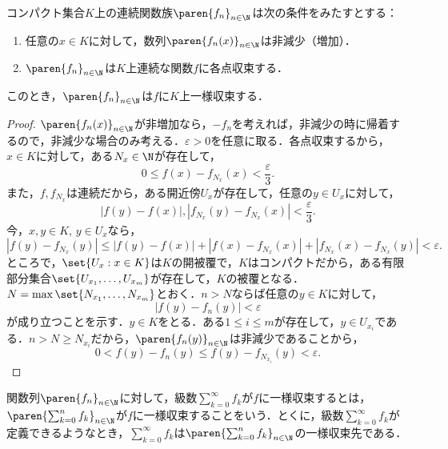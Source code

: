 \documentclass[a4paper,10pt]{ltjsarticle}
\begin{document}
\begin{MyTheorem}
  コンパクト集合\(K\)上の連続関数族\(\paren{f_n}_{n\in\N}\)は次の条件をみたすとする：
  \begin{enumerate}
    \item 任意の\(x \in K\)に対して，数列\(\paren{f_n(x)}_{n\in\N}\)は非減少（増加）．
    \item \(\paren{f_n}_{n\in\N}\)は\(K\)上連続な関数\(f\)に各点収束する．
  \end{enumerate}
  このとき，\(\paren{f_n}_{n\in\N}\)は\(f\)に\(K\)上一様収束する．
\end{MyTheorem}
\begin{proof}
  \(\paren{f_n(x)}_{n\in\N}\)が非増加なら，\(-f_n\)を考えれば，非減少の時に帰着するので，非減少な場合のみ考える．\(\varepsilon > 0\)を任意に取る．各点収束するから，\(x \in K\)に対して，ある\(N_x \in \N\)が存在して，
  \[ 0 \le f(x) - f_{N_x}(x) < \frac{\varepsilon}{3}. \]
  また，\(f, f_{N_x}\)は連続だから，ある開近傍\(U_x\)が存在して，任意の\(y \in U_x\)に対して，
  \[ |f(y) - f(x)|, |f_{N_x}(y) - f_{N_x}(x)| < \frac{\varepsilon}{3}. \]
  今，\(x, y \in K\), \(y \in U_x\)なら，
  \[ |f(y) - f_{N_x}(y)| \le |f(y) - f(x)| + |f(x) - f_{N_x}(x)| + |f_{N_x}(x) - f_{N_x}(y)| < \varepsilon. \]
  ところで，\(\set{U_x: x \in K}\)は\(K\)の開被覆で，\(K\)はコンパクトだから，ある有限部分集合\(\set{U_{x_1}, \dots, U_{x_m}}\)が存在して，\(K\)の被覆となる．\(N = \max\set{N_{x_1}, \dots, N_{x_m}}\)とおく．\(n > N\)ならば任意の\(y \in K\)に対して，
  \[ |f(y) - f_n(y)| < \varepsilon \]
  が成り立つことを示す．\(y \in K\)をとる．ある\(1 \le i \le m\)が存在して，\(y \in U_{x_i}\)である．\(n > N \ge N_{x_i}\)だから，\(\paren{f_n(y)}_{n\in\N}\)は非減少であることから，
  \[ 0 < f(y) - f_n(y) \le f(y) - f_{N_{x_i}}(y) < \varepsilon. \]
\end{proof}

関数列\(\paren{f_n}_{n\in\N}\)に対して，級数\(\sum_{k=0}^\infty f_k\)が\(f\)に一様収束するとは，\(\paren{\sum_{k=0}^n f_k}_{n\in\N}\)が\(f\)に一様収束することをいう．とくに，級数\(\sum_{k=0}^\infty f_k\)が定義できるようなとき，\(\sum_{k=0}^\infty f_k\)は\(\paren{\sum_{k=0}^n f_k}_{n\in\N}\)の一様収束先である．
\end{document}
